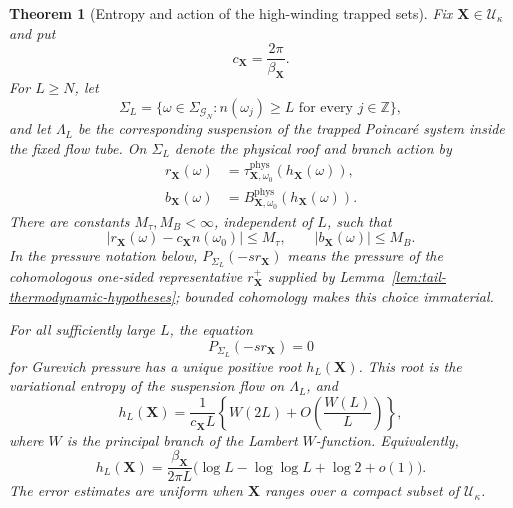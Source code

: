 \documentclass[11pt]{amsart}
\numberwithin{equation}{section}
\newtheorem{theorem}{Theorem}[section]
\theoremstyle{definition}
\theoremstyle{remark}
\newcommand{\cU}{\mathcal U}
\begin{document}
\begin{theorem}[Entropy and action of the high-winding trapped sets]
\label{thm:tail-entropy-action}
Fix $\mathbf X\in\cU_\kappa$ and put
\begin{equation}\label{eq:tail-roof-slope}
 c_{\mathbf X}=\frac{2\pi}{\beta_{\mathbf X}}.
\end{equation}
For $L\ge N$, let
\begin{equation}\label{eq:tail-shift}
 \Sigma_L=\{\omega\in\Sigma_{\mathcal G_N}:
       n(\omega_j)\ge L\text{ for every }j\in\mathbb Z\},
\end{equation}
and let $\Lambda_L$ be the corresponding suspension of the trapped
Poincar\'e system inside the fixed flow tube.  On $\Sigma_L$ denote the
physical roof and branch action by
\begin{align}
 r_{\mathbf X}(\omega)
 &=\tau^{\mathrm{phys}}_{\mathbf X,\omega_0}
       (h_{\mathbf X}(\omega)),\label{eq:tail-roof}\\
 b_{\mathbf X}(\omega)
 &=B^{\mathrm{phys}}_{\mathbf X,\omega_0}
       (h_{\mathbf X}(\omega)).\label{eq:tail-action}
\end{align}
There are constants $M_\tau,M_B<\infty$, independent of $L$, such that
\begin{equation}\label{eq:tail-potential-bounds}
 |r_{\mathbf X}(\omega)-c_{\mathbf X}n(\omega_0)|\le M_\tau,
 \qquad |b_{\mathbf X}(\omega)|\le M_B.
\end{equation}
In the pressure notation below,
$P_{\Sigma_L}(-s r_{\mathbf X})$ means the pressure of the cohomologous
one-sided representative $r_{\mathbf X}^+$ supplied by
Lemma~\ref{lem:tail-thermodynamic-hypotheses}; bounded cohomology makes
this choice immaterial.

For all sufficiently large $L$, the equation
\begin{equation}\label{eq:tail-pressure-root}
 P_{\Sigma_L}(-s r_{\mathbf X})=0
\end{equation}
for Gurevich pressure has a unique positive root $h_L(\mathbf X)$.  This
root is the variational entropy of the suspension flow on $\Lambda_L$, and
\begin{equation}\label{eq:tail-entropy-asymptotic}
 h_L(\mathbf X)
 =\frac{1}{c_{\mathbf X}L}
   \left\{W(2L)+O\!\left(\frac{W(L)}{L}\right)\right\},
\end{equation}
where $W$ is the principal branch of the Lambert $W$-function.  Equivalently,
\begin{equation}\label{eq:tail-entropy-log-asymptotic}
 h_L(\mathbf X)
 =\frac{\beta_{\mathbf X}}{2\pi L}
   \bigl(\log L-\log\log L+\log2+o(1)\bigr).
\end{equation}
The error estimates are uniform when $\mathbf X$ ranges over a compact
subset of $\cU_\kappa$.


\end{theorem}
\end{document}
